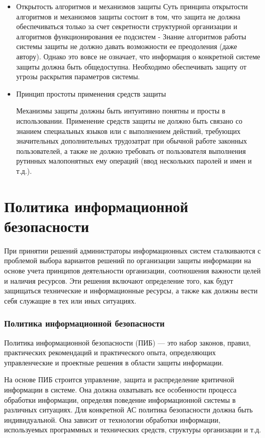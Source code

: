 \begin{itemize}
\item Открытость алгоритмов и механизмов защиты
Суть принципа открытости алгоритмов и механизмов защиты состоит в том, что защита не должна обеспечиваться только за счет секретности структурной организации и алгоритмов функционирования ее подсистем - Знание алгоритмов работы системы защиты не должно давать возможности ее преодоления (даже автору). Однако это вовсе не означает, что информация о конкретной системе защиты должна быть общедоступна. Необходимо обеспечивать защиту от угрозы раскрытия параметров системы.

\item Принцип простоты применения средств защиты

Механизмы защиты должны быть интуитивно понятны и просты в использовании. Применение средств защиты не должно быть связано со знанием специальных языков или с выполнением действий, требующих значительных дополнительных трудозатрат при обычной работе законных пользователей, а также не должно требовать от пользователя выполнения рутинных малопонятных ему операций (ввод нескольких паролей и имен и т.д.).

\end{itemize}


\section{Политика информационной безопасности}

При принятии решений администраторы информационных систем сталкиваются с проблемой выбора вариантов решений по организации защиты информации на основе учета принципов деятельности организации, соотношения важности целей и наличия ресурсов. Эти решения включают определение того, как будут защищаться технические и информационные ресурсы, а также как должны вести себя служащие в тех или иных ситуациях.

\begin{frame}
\frametitle{Политика информационной безопасности}
\begin{definition}%
\alert{Политика информационной безопасности (ПИБ)} --- это набор законов, правил, практических рекомендаций и практического опыта, определяющих управленческие и проектные решения в области защиты информации.
\end{definition}
\end{frame}

На основе ПИБ строится управление, защита и распределение критичной информации в системе. Она должна охватывать все особенности процесса обработки информации, определяя поведение информационной системы в различных ситуациях. Для конкретной АС политика безопасности должна быть индивидуальной. Она зависит от технологии обработки информации, используемых программных и технических средств, структуры организации и т.д.


